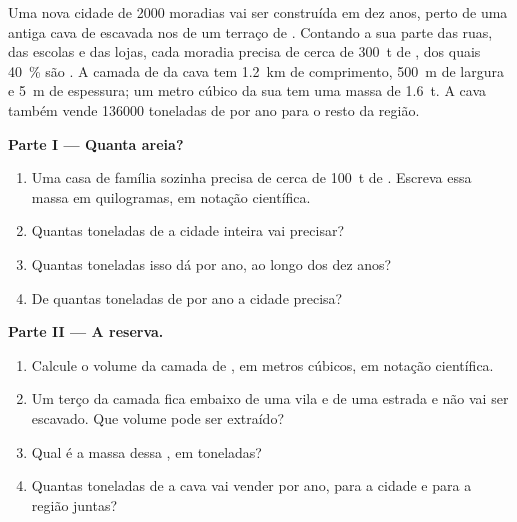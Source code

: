 \begin{problem}
\label{pb:g9:earth-resources:1}
Uma nova cidade de \num{2000} moradias vai ser construída em dez anos,
perto de uma antiga cava de  escavada nos  de um terraço de
. Contando a sua parte das ruas, das escolas e das lojas, cada moradia
precisa de cerca de \qty{300}{t} de , dos quais \qty{40}{\%}
são . A camada de  da cava tem \qty{1.2}{km} de comprimento,
\qty{500}{m} de largura e \qty{5}{m} de espessura; um metro cúbico da sua
 tem uma massa de \qty{1.6}{t}. A cava também vende \num{136000}
toneladas de  por ano para o resto da região.

\noindent\textbf{Parte I --- Quanta areia?}\par\nopagebreak
\begin{enumerate}[beginpenalty=10000]
  \item Uma casa de família sozinha precisa de cerca de \qty{100}{t} de
        . Escreva essa massa em quilogramas, em notação
        científica.
  \item Quantas toneladas de  a cidade inteira vai precisar?
  \item Quantas toneladas isso dá por ano, ao longo dos dez anos?
  \item De quantas toneladas de  por ano a cidade precisa?
\end{enumerate}

\noindent\textbf{Parte II --- A reserva.}\par\nopagebreak
\begin{enumerate}[resume, beginpenalty=10000]
  \item Calcule o volume da camada de , em metros cúbicos, em
        notação científica.
  \item Um terço da camada fica embaixo de uma vila e de uma estrada e
        não vai ser escavado. Que volume pode ser extraído?
  \item Qual é a massa dessa , em toneladas?
  \item Quantas toneladas de  a cava vai vender por ano, para a
        cidade e para a região juntas?
\end{enumerate}


\end{problem}
